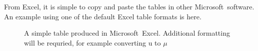 \documentclass[a4paper,11pt]{article}\usepackage[]{graphicx}\usepackage[]{color}
\begin{document}
From Excel, it is simple to copy and paste the tables in other Microsoft\textregistered\ software. An example using one of the default Excel table formats is here.

\begin{figure}[ht!]
\centering
\caption{A simple table produced in Microsoft\textregistered\ Excel. Additional formatting will be requried, for example converting u to  $\mu$ }
\label{overflow}
\end{figure}

\clearpage

% 
% 
% 
% 

\end{document}

